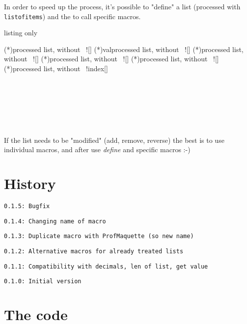 \documentclass[11pt,a4paper]{ltxdoc}
\begin{document}
In order to speed up the process, it's possible to "define" a list (processed with \texttt{listofitems}) and the to call specific macros.

\begin{DemoCode}{listing only}

\lenofdeflist(*){processed list, without \ !}[\macro]
\countvalindeflist(*){val}{processed list, without \ !}[\macro]
\meanofdeflist(*){processed list, without \ !}[\macro]
\sumofdeflist(*){processed list, without \ !}[\macro]
\prodofdeflist(*){processed list, without \ !}[\macro]
\getvaluefromdeflist(*){processed list, without \ !}{index}[\macro]
\end{DemoCode}

\begin{DemoCode}{}
\showitems{\mydeflist}

\\
\\
\\
\\
\\
\end{DemoCode}

If the list needs to be "modified" (add, remove, reverse) the best is to use individual macros, and after use \textit{define} and specific macros :-)

\pagebreak

\section{History}

\texttt{0.1.5: Bugfix}

\texttt{0.1.4: Changing name of macro}

\texttt{0.1.3: Duplicate macro with ProfMaquette (so new name)}

\texttt{0.1.2: Alternative macros for already treated lists}

\texttt{0.1.1: Compatibility with decimals, len of list, get value}

\texttt{0.1.0: Initial version}

\section{The code}

\end{document}
